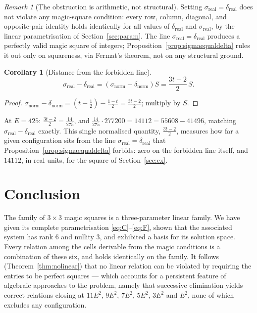 \documentclass[12pt]{article}
\newtheorem{corollary}[theorem]{Corollary}
\theoremstyle{remark}
\newtheorem{remark}[theorem]{Remark}
\begin{document}
\begin{remark}[The obstruction is arithmetic, not structural]
Setting $\sigma_{\text{real}}=\delta_{\text{real}}$ does not violate
any magic-square condition: every row, column, diagonal, and
opposite-pair identity holds identically for all values of
$\delta_{\text{real}}$ and $\sigma_{\text{real}}$, by the linear
parametrisation of Section~\ref{sec:param}. The line
$\sigma_{\text{real}}=\delta_{\text{real}}$ produces a perfectly valid
magic square of integers; Proposition~\ref{prop:sigmaequaldelta} rules
it out only on squareness, via Fermat's theorem, not on any structural
ground.
\end{remark}

\begin{corollary}[Distance from the forbidden line]\label{cor:fermatdistance}
\[
\sigma_{\text{real}} - \delta_{\text{real}}
= \left(\sigma_{\text{norm}}-\delta_{\text{norm}}\right) S
= \frac{3t-2}{2}\,S .
\]
\end{corollary}

\begin{proof}
$\sigma_{\text{norm}}-\delta_{\text{norm}}
= \left(t-\tfrac12\right) - \tfrac{1-t}{2} = \tfrac{3t-2}{2}$; multiply
by $S$.
\end{proof}

At $E=425$: $\tfrac{3t-2}{2} = \tfrac{14}{275}$, and
$\tfrac{14}{275}\cdot277200 = 14112 = 55608-41496$, matching
$\sigma_{\text{real}}-\delta_{\text{real}}$ exactly. This single
normalised quantity, $\tfrac{3t-2}{2}$, measures how far a given
configuration sits from the line
$\sigma_{\text{real}}=\delta_{\text{real}}$ that
Proposition~\ref{prop:sigmaequaldelta} forbids: zero on the forbidden
line itself, and $14112$, in real units, for the square of
Section~\ref{sec:ex}.

\section{Conclusion}

The family of $3\times3$ magic squares is a three-parameter linear
family. We have given its complete parametrisation
\eqref{eq:C}--\eqref{eq:F}, shown that the associated system has rank
$6$ and nullity $3$, and exhibited a basis for its solution space.
Every relation among the cells derivable from the magic conditions is a
combination of these six, and holds identically on the family. It
follows (Theorem~\ref{thm:nolinear}) that no linear relation can be
violated by requiring the entries to be perfect squares --- which
accounts for a persistent feature of algebraic approaches to the
problem, namely that successive elimination yields correct relations
closing at $11E^2$, $9E^2$, $7E^2$, $5E^2$, $3E^2$ and $E^2$, none of
which excludes any configuration.
\end{document}
